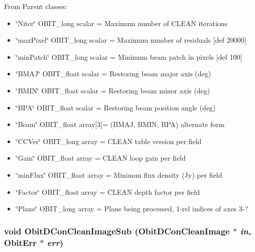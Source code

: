 From Parent classes: \begin{itemize}
\item \char`\"{}Niter\char`\"{} OBIT\_\-long scalar = Maximum number of CLEAN iterations \item \char`\"{}max\-Pixel\char`\"{} OBIT\_\-long scalar = Maximum number of residuals [def 20000] \item \char`\"{}min\-Patch\char`\"{} OBIT\_\-long scalar = Minimum beam patch in pixels [def 100] \item \char`\"{}BMAJ\char`\"{} OBIT\_\-float scalar = Restoring beam major axis (deg) \item \char`\"{}BMIN\char`\"{} OBIT\_\-float scalar = Restoring beam minor axis (deg) \item \char`\"{}BPA\char`\"{} OBIT\_\-float scalar = Restoring beam position angle (deg) \item \char`\"{}Beam\char`\"{} OBIT\_\-float array[3]= (BMAJ, BMIN, BPA) alternate form \item \char`\"{}CCVer\char`\"{} OBIT\_\-long array = CLEAN table version per field \item \char`\"{}Gain\char`\"{} OBIT\_\-float array = CLEAN loop gain per field \item \char`\"{}min\-Flux\char`\"{} OBIT\_\-float array = Minimun flux density (Jy) per field \item \char`\"{}Factor\char`\"{} OBIT\_\-float array = CLEAN depth factor per field \item \char`\"{}Plane\char`\"{} OBIT\_\-long array = Plane being processed, 1-rel indices of axes 3-? 
\end{itemize}
\subsubsection{\setlength{\rightskip}{0pt plus 5cm}void Obit\-DCon\-Clean\-Image\-Sub ({\bf Obit\-DCon\-Clean\-Image} $\ast$ {\em in}, {\bf Obit\-Err} $\ast$ {\em err})}\label{ObitDConCleanImage_8h_a11}


